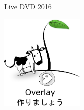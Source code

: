 \documentclass{cd-cover}
\begin{document}
\CDbookletTopMargin=0pt
\CDbookletMargin=0pt
\begin{bookletsheets}
\vspace*{5mm}
\hspace{5mm}
\begin{center}
{\LARGE Live DVD 2016}\par\bigskip
\includegraphics[width=4cm]{larry0}
\end{center}
\end{bookletsheets}
\end{document}
